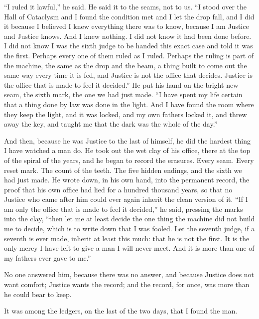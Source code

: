 ``I ruled it lawful,'' he said. He said it to the seams, not to us. ``I stood over the Hall of Cataclysm and I found the condition met and I let the drop fall, and I did it because I believed I knew everything there was to know, because I am Justice and Justice knows. And I knew nothing. I did not know it had been done before. I did not know I was the sixth judge to be handed this exact case and told it was the first. Perhaps every one of them ruled as I ruled. Perhaps the ruling is part of the machine, the same as the drop and the beam, a thing built to come out the same way every time it is fed, and Justice is not the office that decides. Justice is the office that is made to feel it decided.'' He put his hand on the bright new seam, the sixth mark, the one we had just made. ``I have spent my life certain that a thing done by law was done in the light. And I have found the room where they keep the light, and it was locked, and my own fathers locked it, and threw away the key, and taught me that the dark was the whole of the day.''\par

And then, because he was Justice to the last of himself, he did the hardest thing I have watched a man do. He took out the wet clay of his office, there at the top of the spiral of the years, and he began to record the erasures. Every seam. Every reset mark. The count of the teeth. The five hidden endings, and the sixth we had just made. He wrote down, in his own hand, into the permanent record, the proof that his own office had lied for a hundred thousand years, so that no Justice who came after him could ever again inherit the clean version of it. ``If I am only the office that is made to feel it decided,'' he said, pressing the marks into the clay, ``then let me at least decide the one thing the machine did not build me to decide, which is to write down that I was fooled. Let the seventh judge, if a seventh is ever made, inherit at least this much: that he is not the first. It is the only mercy I have left to give a man I will never meet. And it is more than one of my fathers ever gave to me.''\par

No one answered him, because there was no answer, and because Justice does not want comfort; Justice wants the record; and the record, for once, was more than he could bear to keep.\par

\ornament

It was among the ledgers, on the last of the two days, that I found the man.\par

